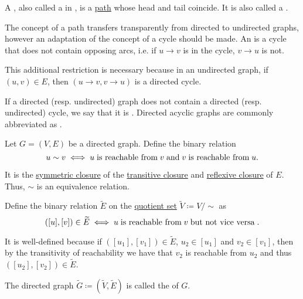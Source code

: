 \begin{definition}\label{def:graph_cycle}
  A , also called a  in \cite[ch. 1, sec. 1.4]{GondranMinoux1984Graphs}, is a \hyperref[def:graph_directed_path]{path} whose head and tail coincide. It is also called a .

  The concept of a path transfers transparently from directed to undirected graphs, however an adaptation of the concept of a cycle should be made. An  is a cycle that does not contain opposing arcs, i.e. if \( u \to v \) is in the cycle, \( v \to u \) is not.

  This additional restriction is necessary because in an undirected graph, if \( (u, v) \in E \), then \( (u \to v, v \to u) \) is a directed cycle.

  If a directed (resp. undirected) graph does not contain a directed (resp. undirected) cycle, we say that it is . Directed acyclic graphs are commonly abbreviated as .
\end{definition}

\begin{definition}\label{def:graph_condensation}
  Let \( G = (V, E) \) be a directed graph. Define the binary relation
  \begin{equation*}
    u \sim v \iff u \T{is reachable from} v \T{and} v \T{is reachable from} u.
  \end{equation*}

  It is the \hyperref[def:relation_closures/symmetric]{symmetric closure} of the \hyperref[def:relation_closures/transitive]{transitive closure} and \hyperref[def:relation_closures/reflexive]{reflexive closure} of \( E \). Thus, \( \sim \) is an equivalence relation.

  Define the binary relation \( \widetilde{E} \) on the \hyperref[def:equivalence_relation/quotient]{quotient set} \( \widetilde{V} \coloneqq V / {\sim} \) as
  \begin{equation*}
    ([u], [v]) \in \widetilde{E} \iff u \T{is reachable from} v \T{but not vice versa}.
  \end{equation*}

  It is well-defined because if \( ([u_1], [v_1]) \in \widetilde{E} \), \( u_2 \in [u_1] \) and \( v_2 \in [v_1] \), then by the transitivity of reachability we have that \( v_2 \) is reachable from \( u_2 \) and thus \( ([u_2], [v_2]) \in \widetilde{E} \).

  The directed graph \( \widetilde{G} \coloneqq (\widetilde{V}, \widetilde{E}) \) is called the  of \( G \).
\end{definition}

